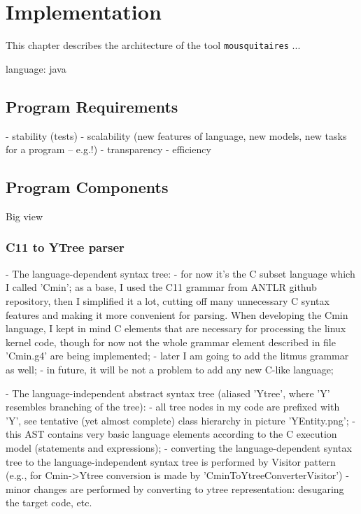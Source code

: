 \chapter{Implementation}
\label{section:impl}

This chapter describes the architecture of the tool \texttt{mousquitaires} ...

language: java


\section{Program Requirements}
\label{section:impl:requirements}

- stability (tests)
- scalability (new features of language, new models, new tasks for a program -- e.g.!)
- transparency
- efficiency

\section{Program Components}
\label{section:impl:comp}

Big view

\subsection{C11 to YTree parser}
\label{section:impl:comp:ytree}

- The language-dependent syntax tree:
        - for now it's the C subset language which I called 'Cmin'; as a base, I used the C11 grammar from ANTLR github repository, then I simplified it a lot, cutting off many unnecessary C syntax features and making it more convenient for parsing. When developing the Cmin language, I kept in mind C elements that are necessary for processing the linux kernel code, though for now not the whole grammar element described in file 'Cmin.g4' are being implemented;
        - later I am going to add the litmus grammar as well;
        - in future, it will be not a problem to add any new C-like language;

- The language-independent abstract syntax tree (aliased 'Ytree', where 'Y' resembles branching of the tree):
        - all tree nodes in my code are prefixed with 'Y', see tentative (yet almost complete) class hierarchy in picture 'YEntity.png';
        - this AST contains very basic language elements according to the C execution model (statements and expressions);
        - converting the language-dependent syntax tree to the language-independent syntax tree is performed by Visitor pattern (e.g., for Cmin->Ytree conversion is made by 'CminToYtreeConverterVisitor')
        - minor changes are performed by converting to ytree representation: desugaring the target code, etc.


